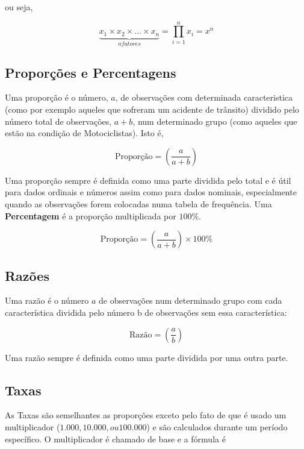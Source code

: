 ou seja,

\begin{equation}\label{}
    \underbrace{x_{1} \times x_{2} \times  \ldots \times x_{n}}_{n fatores}= \prod_{i=1}^{n}x_{i}= x^{n}
\end{equation}









\subsection{Proporções e Percentagens}


Uma proporção é o número, $a$, de observações com determinada caracteristica (como por exemplo aqueles que sofreram um acidente de trânsito) dividido pelo número total de observações, $a+b$, num determinado grupo (como aqueles que estão na condição de Motociclistas). Isto é,


$$ 
\mbox{Proporção} = \left( \frac{a}{a+b} \right)
$$

Uma proporção sempre é definida como uma parte dividida pelo total e é útil para dados ordinais e números assim como para dados nominais, especialmente quando as observações forem colocadas numa tabela de frequência. Uma \textbf{Percentagem} é a proporção multiplicada por $100\%$.\vskip0.3cm


$$ \mbox{Proporção} = \left( \frac{a}{a+b} \right) \times 100\% $$

\newpage
\subsection{Razões}

Uma razão é o número $a$ de observações num determinado grupo com cada característica
dividida pelo número b de observações sem essa característica:


$$ 
\mbox{Razão} = \left( \frac{a}{b} \right)
$$

Uma razão sempre é definida como uma parte dividida por uma outra parte.\vskip0.3cm

\subsection{Taxas}

As Taxas são semelhantes as proporções exceto pelo fato de que é usado um multiplicador ($1.000 , 10.000 , ou 100.000$) e são calculados durante um período específico. O multiplicador é chamado de base e a fórmula é



